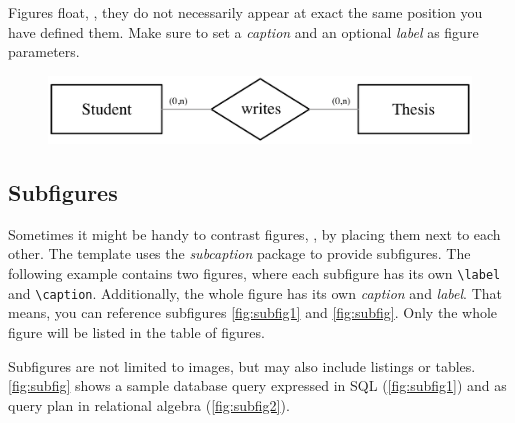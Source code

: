 Figures float, \ie, they do not necessarily appear at exact the same position you have defined them. Make sure to set a  \textit{caption} and an optional \textit{label} as figure parameters. 

\begin{figure}[caption={Relationship of students and theses}, label={fig:img01}]
	{	\includegraphics[width=.6\textwidth]{figures/figure01.pdf}}
\end{figure}

\subsection{Subfigures}
Sometimes it might be handy to contrast figures, \ie, by placing them next to each other. The template uses the \textit{subcaption} package to provide subfigures. The following example contains two figures, where each subfigure has its own \texttt{\textbackslash label} and \texttt{\textbackslash caption}. Additionally, the whole figure has its own \textit{caption} and \textit{label}. That means, you can reference subfigures  \fig \ref{fig:subfig1} and \fig  \ref{fig:subfig}. Only the whole figure will be listed in the table of figures.

Subfigures are not limited to images, but may also include listings or tables. \Fig \ref{fig:subfig} shows a sample database query expressed in \ac{SQL} (\fig \ref{fig:subfig1}) and as query plan in relational algebra  (\fig \ref{fig:subfig2}).
 
